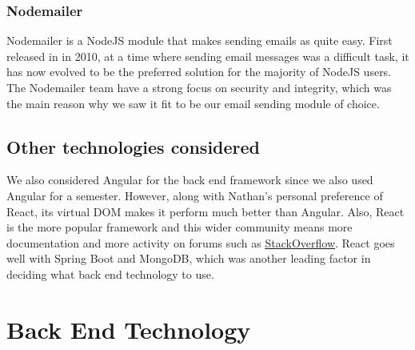 \subsubsection{Nodemailer}
Nodemailer is a NodeJS module that makes sending emails as quite easy. First released in in 2010, at a time where sending email messages was a difficult task, it has now evolved to be the preferred solution for the majority of NodeJS users.
The Nodemailer team have a strong focus on security and integrity, which was the main reason why we saw it fit to be our email sending module of choice.

\subsection{Other technologies considered}
We also considered Angular for the back end framework since we also used Angular for a semester. However, along with Nathan's personal preference of React, its virtual DOM makes it perform much better than Angular. Also, React is the more popular framework and this wider community means more documentation and more activity on forums such as \underline{\href{https://stackoverflow.com}{StackOverflow}}. React goes well with Spring Boot and MongoDB, which was another leading factor in deciding what back end technology to use.  \newline

\section{Back End Technology}

